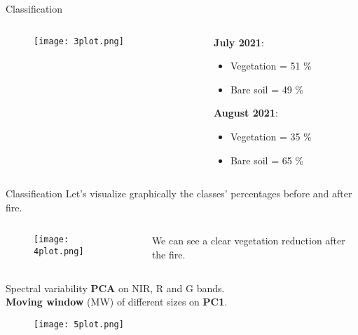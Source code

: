 \documentclass{beamer} %
\begin{document}
\begin{frame}{Classification}
\begin{columns}
    \begin{column}{0.65\textwidth}
    \begin{figure}
           \centering
           \texttt{[image: 3plot.png]}
       \end{figure}   
    \end{column}

    \begin{column}{0.5\textwidth}
    \textbf{July 2021}:
        \begin{itemize}
            \item Vegetation = 51 \%
            \item Bare soil = 49 \%
        \end{itemize}
        \bigskip
        \bigskip
        \bigskip
        \textbf{August 2021}:
        \begin{itemize}
            \item Vegetation = 35 \%
            \item Bare soil = 65 \%
        \end{itemize}
    \end{column}
\end{columns}    
\end{frame}

\begin{frame}{Classification}
\centering
Let's visualize graphically the classes' percentages before and after fire. 
\begin{columns}
    \begin{column}{0.65\textwidth}
    \begin{figure}
        \centering
        \texttt{[image: 4plot.png]} 
    \end{figure}
    \end{column}

    \begin{column}{0.5\textwidth}
        We can see a clear vegetation reduction after the fire. 
    \end{column}
\end{columns}     
\end{frame}

\begin{frame}{Spectral variability}
\centering
\textbf{PCA} on NIR, R and G bands.\\
\textbf{Moving window} (MW) of different sizes on \textbf{PC1}.
\begin{figure}
      \centering
      \texttt{[image: 5plot.png]}
  \end{figure}      
\end{frame}
\end{document}
